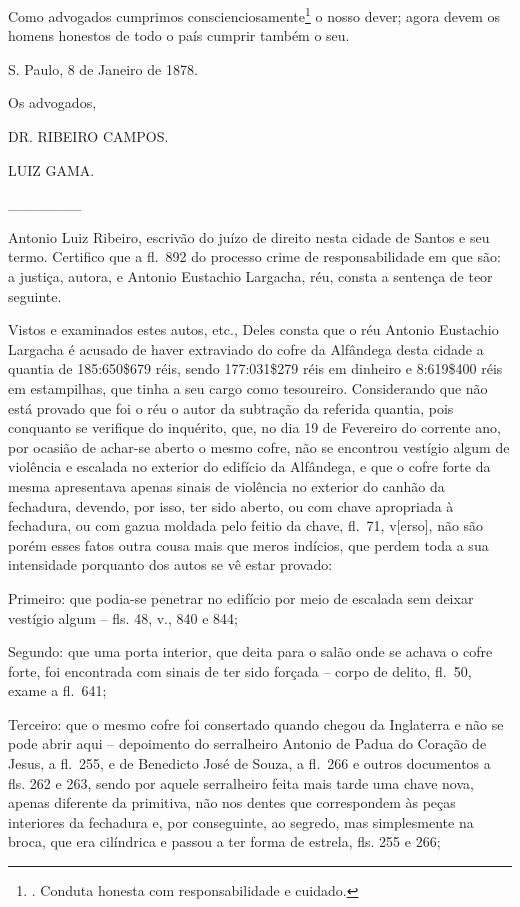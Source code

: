 Como advogados cumprimos conscienciosamente\footnote{. Conduta honesta
  com responsabilidade e cuidado.} o nosso dever; agora devem os homens
honestos de todo o país cumprir também o seu.

S. Paulo, 8 de Janeiro de 1878.

Os advogados,

DR. RIBEIRO CAMPOS.

LUIZ GAMA.

\_\_\_\_\_\_\_

Antonio Luiz Ribeiro, escrivão do juízo de direito nesta cidade de
Santos e seu termo. Certifico que a fl.~892 do processo crime de
responsabilidade em que são: a justiça, autora, e Antonio Eustachio
Largacha, réu, consta a sentença de teor seguinte.

Vistos e examinados estes autos, etc., Deles consta que o réu Antonio
Eustachio Largacha é acusado de haver extraviado do cofre da Alfândega
desta cidade a quantia de 185:650\$679 réis, sendo 177:031\$279 réis em
dinheiro e 8:619\$400 réis em estampilhas, que tinha a seu cargo como
tesoureiro. Considerando que não está provado que foi o réu o autor da
subtração da referida quantia, pois conquanto se verifique do inquérito,
que, no dia 19 de Fevereiro do corrente ano, por ocasião de achar-se
aberto o mesmo cofre, não se encontrou vestígio algum de violência e
escalada no exterior do edifício da Alfândega, e que o cofre forte da
mesma apresentava apenas sinais de violência no exterior do canhão da
fechadura, devendo, por isso, ter sido aberto, ou com chave apropriada à
fechadura, ou com gazua moldada pelo feitio da chave, fl.~71,
v{[}erso{]}, não são porém esses fatos outra cousa mais que meros
indícios, que perdem toda a sua intensidade porquanto dos autos se vê
estar provado:

Primeiro: que podia-se penetrar no edifício por meio de escalada sem
deixar vestígio algum -- fls. 48, v., 840 e 844;

Segundo: que uma porta interior, que deita para o salão onde se achava o
cofre forte, foi encontrada com sinais de ter sido forçada -- corpo de
delito, fl.~50, exame a fl.~641;

Terceiro: que o mesmo cofre foi consertado quando chegou da Inglaterra e
não se pode abrir aqui -- depoimento do serralheiro Antonio de Padua do
Coração de Jesus, a fl.~255, e de Benedicto José de Souza, a fl.~266 e
outros documentos a fls. 262 e 263, sendo por aquele serralheiro feita
mais tarde uma chave nova, apenas diferente da primitiva, não nos dentes
que correspondem às peças interiores da fechadura e, por conseguinte, ao
segredo, mas simplesmente na broca, que era cilíndrica e passou a ter
forma de estrela, fls. 255 e 266;

